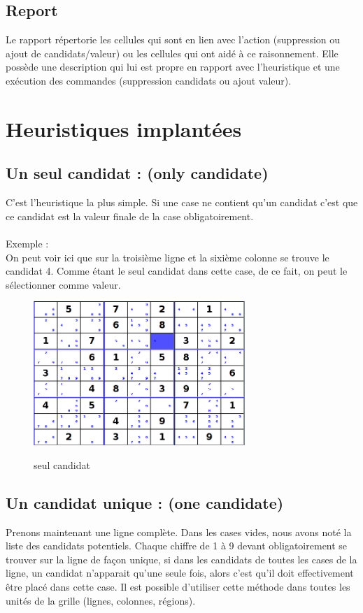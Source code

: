 \subsection{Report}
Le rapport répertorie les cellules qui sont en lien avec l'action (suppression ou ajout de candidats/valeur) ou les cellules
qui ont aidé à ce raisonnement. Elle possède une description qui lui est propre en rapport avec l'heuristique et 
une exécution des commandes (suppression candidats ou ajout valeur).

\section{Heuristiques implantées}
\subsection{Un seul candidat : (only candidate)}
C'est l'heuristique la plus simple. Si une case ne contient qu'un candidat c'est que ce candidat est la valeur 
finale de la case obligatoirement.\\
\\

Exemple : \\
On peut voir ici que sur la troisième ligne et la sixième colonne se trouve le candidat 4.
Comme étant le seul candidat dans cette case, de ce fait, on peut le sélectionner comme valeur.\\

\begin{figure}[ht]
  \caption{\label{annexe1} seul candidat}
  \includegraphics [width=80mm]{images/only-candidate.png} \\[0.5cm]
\end{figure}

\newpage

\subsection{Un candidat unique : (one candidate)}
Prenons maintenant une ligne complète. Dans les cases vides, nous avons noté la liste des candidats potentiels. 
Chaque chiffre de 1 à 9 devant obligatoirement se trouver sur la ligne de façon unique, si dans les candidats 
de toutes les cases de la ligne, un candidat n'apparait qu'une seule fois, alors c'est qu'il doit effectivement 
être placé dans cette case.
Il est possible d'utiliser cette méthode dans toutes les unités de la grille (lignes, colonnes, régions).

